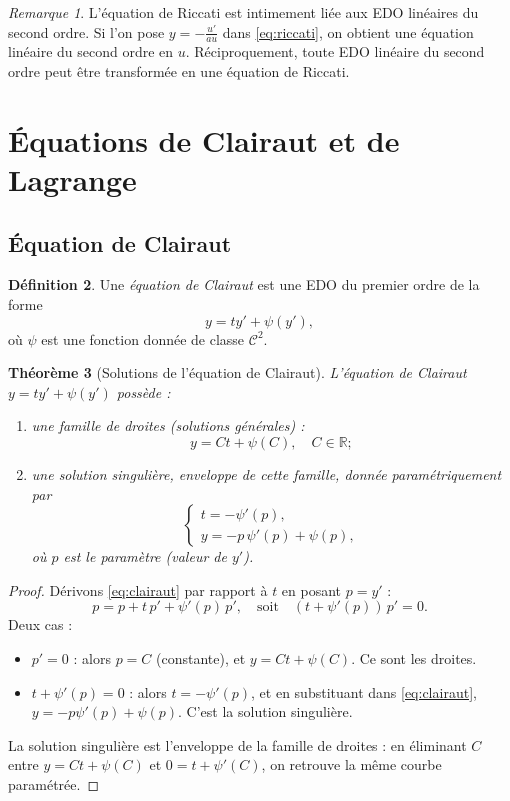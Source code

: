 \documentclass[12pt,a4paper,openany]{book}
\theoremstyle{definition}
\newtheorem{definition}{Définition}[chapter]
\theoremstyle{plain}
\newtheorem{theoreme}[definition]{Théorème}
\theoremstyle{remark}
\newtheorem{remarque}[definition]{Remarque}
\newcommand{\R}{\mathbb{R}}
\begin{document}
\begin{remarque}
\label{rem:riccati-lien-lineaire}
L'équation de Riccati est intimement liée aux EDO linéaires du second ordre. Si l'on pose $y = -\frac{u'}{au}$ dans \eqref{eq:riccati}, on obtient une équation linéaire du second ordre en $u$. Réciproquement, toute EDO linéaire du second ordre peut être transformée en une équation de Riccati.
\end{remarque}

\section{Équations de Clairaut et de Lagrange}
\label{sec:clairaut-lagrange}

\subsection{Équation de Clairaut}
\label{subsec:clairaut}

\begin{definition}
\label{def:clairaut}
Une \emph{équation de Clairaut} est une EDO du premier ordre de la forme
\begin{equation}
\label{eq:clairaut}
y = ty' + \psi(y'),
\end{equation}
où $\psi$ est une fonction donnée de classe $\mathscr{C}^2$.
\end{definition}

\begin{theoreme}[Solutions de l'équation de Clairaut]
\label{thm:clairaut}
L'équation de Clairaut $y = ty' + \psi(y')$ possède :
\begin{enumerate}[label=(\roman*)]
\item une famille de droites (solutions générales) :
\[
y = Ct + \psi(C), \quad C \in \R ;
\]
\item une solution singulière, enveloppe de cette famille, donnée paramétriquement par
\[
\begin{cases}
t = -\psi'(p),\\
y = -p\,\psi'(p) + \psi(p),
\end{cases}
\]
où $p$ est le paramètre (valeur de $y'$).
\end{enumerate}
\end{theoreme}

\begin{proof}
Dérivons \eqref{eq:clairaut} par rapport à $t$ en posant $p = y'$ :
\[
p = p + t\,p' + \psi'(p)\,p', \quad \text{soit} \quad (t + \psi'(p))\,p' = 0.
\]
Deux cas :
\begin{itemize}
\item $p' = 0$ : alors $p = C$ (constante), et $y = Ct + \psi(C)$. Ce sont les droites.
\item $t + \psi'(p) = 0$ : alors $t = -\psi'(p)$, et en substituant dans \eqref{eq:clairaut}, $y = -p\psi'(p) + \psi(p)$. C'est la solution singulière.
\end{itemize}
La solution singulière est l'enveloppe de la famille de droites : en éliminant $C$ entre $y = Ct + \psi(C)$ et $0 = t + \psi'(C)$, on retrouve la même courbe paramétrée.
\end{proof}
\end{document}
